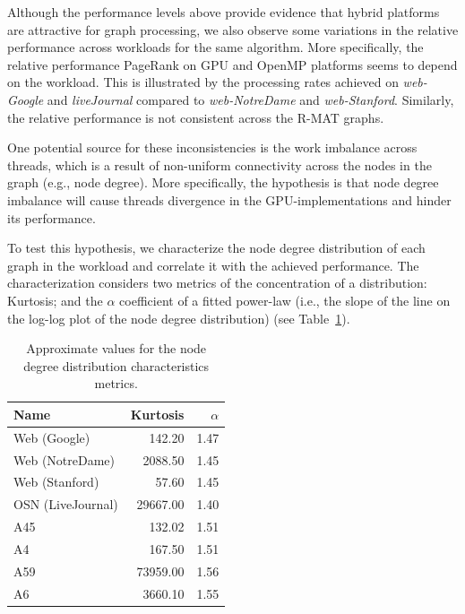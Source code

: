 Although the performance levels above provide evidence that hybrid platforms are attractive for graph processing, we also observe some variations in the relative performance across workloads for the same algorithm. More specifically, the relative performance PageRank on GPU and OpenMP platforms seems to depend on the workload. This is illustrated by the processing rates achieved on {\em web-Google} and {\em liveJournal} compared to {\em web-NotreDame} and {\em web-Stanford}. Similarly, the relative performance is not consistent across the R-MAT graphs. 

One potential source for these inconsistencies is the work imbalance across threads, which is a result of non-uniform connectivity across the nodes in the graph (e.g., node degree). More specifically, the hypothesis is that node degree imbalance will cause threads divergence in the GPU-implementations and hinder its performance. 

To test this hypothesis, we characterize the node degree distribution of each graph in the workload and correlate it with the achieved performance. The characterization considers two metrics of the concentration of a distribution: Kurtosis; and the $\alpha$ coefficient of a fitted power-law (i.e., the slope of the line on the log-log plot of the node degree distribution) (see Table~\ref{tab:kurtosis}). 

\begin{table}[ht]
\centering
\begin{tabular}{l|r|r}
Name              & Kurtosis   & $\alpha$ \\\hline
Web (Google)      & 142.20   & 1.47    \\\hline
Web (NotreDame)   & 2088.50  & 1.45    \\\hline
Web (Stanford)    & 57.60    & 1.45    \\\hline
OSN (LiveJournal) & 29667.00 & 1.40    \\\hline
A45               & 132.02  & 1.51    \\\hline
A4                & 167.50   & 1.51    \\\hline
A59               & 73959.00 & 1.56    \\\hline
A6                & 3660.10  & 1.55     \\\hline
\end{tabular}
\caption{Approximate values for the node degree distribution characteristics metrics.}
\label{tab:kurtosis}
\end{table}
            
